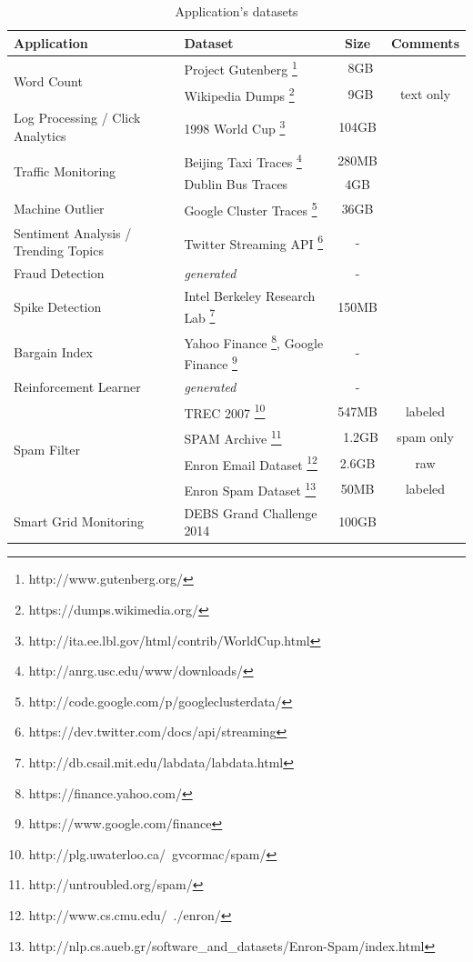 \documentclass[ppgc,diss,english]{iiufrgs}
\begin{document}
\begin{table}[t]
\begin{center}
	\footnotesize
	\begin{tabular}{ | l | l | c | c |}
   		\hline
		\textbf{Application} & \textbf{Dataset} & \textbf{Size} & \textbf{Comments} \\ \hline
		
        \multirow{2}{*}{Word Count} & Project Gutenberg \footnote{http://www.gutenberg.org/} & ~8GB & \\\cline{2-4}
        & Wikipedia Dumps \footnote{https://dumps.wikimedia.org/} & ~9GB & text only \\\hline
        
        Log Processing / Click Analytics & 1998 World Cup \footnote{http://ita.ee.lbl.gov/html/contrib/WorldCup.html} & 104GB & \\\hline
        \multirow{2}{*}{Traffic Monitoring} & Beijing Taxi Traces \footnote{http://anrg.usc.edu/www/downloads/} & 280MB & \\\cline{2-4}
        & Dublin Bus Traces & 4GB & \\\hline
        
        Machine Outlier & Google Cluster Traces \footnote{http://code.google.com/p/googleclusterdata/} & 36GB & \\\hline
        Sentiment Analysis / Trending Topics & Twitter Streaming API \footnote{https://dev.twitter.com/docs/api/streaming} & - & \\\hline
        Fraud Detection & \emph{generated} & - & \\\hline
        Spike Detection & Intel Berkeley Research Lab \footnote{http://db.csail.mit.edu/labdata/labdata.html} & 150MB & \\\hline
        Bargain Index & Yahoo Finance \footnote{https://finance.yahoo.com/}, Google Finance \footnote{https://www.google.com/finance} & - & \\\hline
        Reinforcement Learner & \emph{generated} & - & \\\hline
        
        \multirow{4}{*}{Spam Filter} & TREC 2007 \footnote{http://plg.uwaterloo.ca/~gvcormac/spam/} & 547MB & labeled \\\cline{2-4}
        & SPAM Archive \footnote{http://untroubled.org/spam/} & ~1.2GB & spam only\\\cline{2-4}
        & Enron Email Dataset \footnote{http://www.cs.cmu.edu/~./enron/} & 2.6GB & raw \\\cline{2-4}
        & Enron Spam Dataset \footnote{http://nlp.cs.aueb.gr/software\_and\_datasets/Enron-Spam/index.html} & 50MB & labeled\\\hline
        
        Smart Grid Monitoring & DEBS Grand Challenge 2014 & 100GB & \\\hline
        
	\end{tabular}
	\vspace{5px}
	\caption{Application's datasets}
	\label{table:app_datasets}
\end{center}
\end{table}
\end{document}
